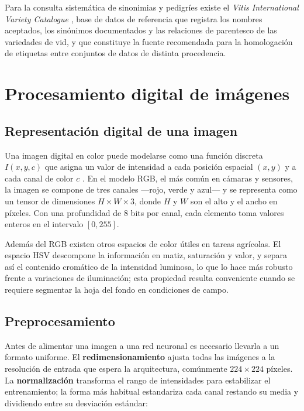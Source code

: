 Para la consulta sistemática de sinonimias y pedigríes existe el
\textit{Vitis International Variety Catalogue} \citep{vivc}, base de datos
de referencia que registra los nombres aceptados, los sinónimos
documentados y las relaciones de parentesco de las variedades de vid, y que
constituye la fuente recomendada para la homologación de etiquetas entre
conjuntos de datos de distinta procedencia.

\section{Procesamiento digital de imágenes}

\subsection{Representación digital de una imagen}

Una imagen digital en color puede modelarse como una función discreta
$I(x,y,c)$ que asigna un valor de intensidad a cada posición espacial
$(x,y)$ y a cada canal de color $c$ \citep{gonzalez2018}. En el modelo RGB,
el más común en cámaras y sensores, la imagen se compone de tres canales
—rojo, verde y azul— y se representa como un tensor de dimensiones
$H \times W \times 3$, donde $H$ y $W$ son el alto y el ancho en píxeles.
Con una profundidad de 8 bits por canal, cada elemento toma valores enteros
en el intervalo $[0, 255]$.

Además del RGB existen otros espacios de color útiles en tareas agrícolas.
El espacio HSV descompone la información en matiz, saturación y valor, y
separa así el contenido cromático de la intensidad luminosa, lo que lo hace
más robusto frente a variaciones de iluminación; esta propiedad resulta
conveniente cuando se requiere segmentar la hoja del fondo en condiciones de
campo.

\subsection{Preprocesamiento}

Antes de alimentar una imagen a una red neuronal es necesario llevarla a un
formato uniforme. El \textbf{redimensionamiento} ajusta todas las imágenes a
la resolución de entrada que espera la arquitectura, comúnmente
$224 \times 224$ píxeles. La \textbf{normalización} transforma el rango de
intensidades para estabilizar el entrenamiento; la forma más habitual
estandariza cada canal restando su media y dividiendo entre su desviación
estándar:

